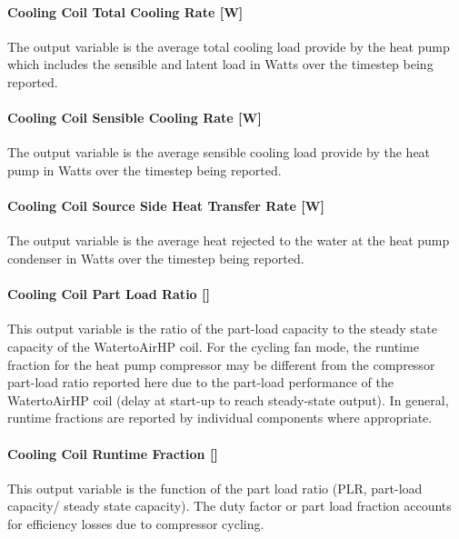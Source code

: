 \paragraph{Cooling Coil Total Cooling Rate {[}W{]}}\label{cooling-coil-total-cooling-rate-w-8}

The output variable is the average total cooling load provide by the heat pump which includes the sensible and latent load in Watts over the timestep being reported.

\paragraph{Cooling Coil Sensible Cooling Rate {[}W{]}}\label{cooling-coil-sensible-cooling-rate-w-8}

The output variable is the average sensible cooling load provide by the heat pump in Watts over the timestep being reported.

\paragraph{Cooling Coil Source Side Heat Transfer Rate {[}W{]}}\label{cooling-coil-source-side-heat-transfer-rate-w-1}

The output variable is the average heat rejected to the water at the heat pump condenser in Watts over the timestep being reported.

\paragraph{Cooling Coil Part Load Ratio {[]}}\label{cooling-coil-part-load-ratio-1}

This output variable is the ratio of the part-load capacity to the steady state capacity of the WatertoAirHP coil. For the cycling fan mode, the runtime fraction for the heat pump compressor may be different from the compressor part-load ratio reported here due to the part-load performance of the WatertoAirHP coil (delay at start-up to reach steady-state output). In general, runtime fractions are reported by individual components where appropriate.

\paragraph{Cooling Coil Runtime Fraction {[]}}\label{cooling-coil-runtime-fraction-6}

This output variable is the function of the part load ratio (PLR, part-load capacity/ steady state capacity). The duty factor or part load fraction accounts for efficiency losses due to compressor cycling.


